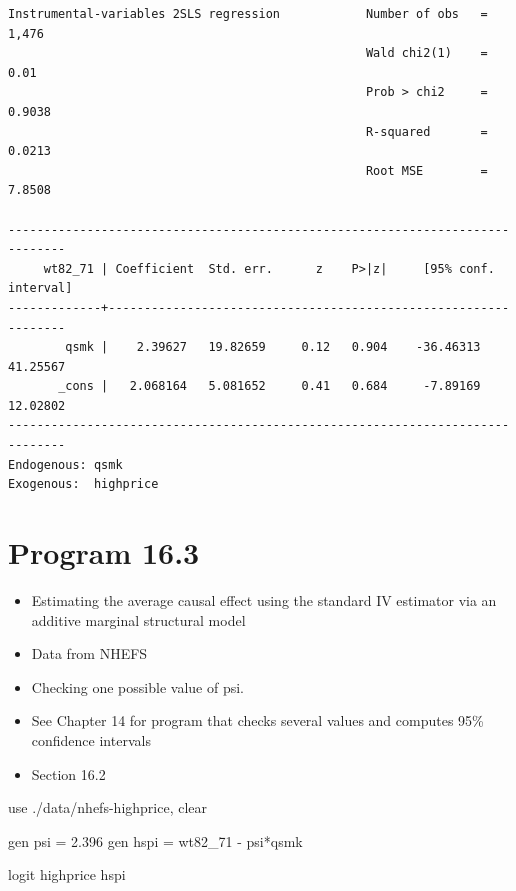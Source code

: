 \documentclass[
  10pt,
  a4paper,
]{book}
\newenvironment{Shaded}{\begin{snugshade}}{\end{snugshade}}
\newcommand{\KeywordTok}[1]{\textcolor[rgb]{0.00,0.46,0.62}{#1}}
\newcommand{\NormalTok}[1]{\textcolor[rgb]{0.00,0.46,0.62}{#1}}
\providecommand{\tightlist}{%
  \setlength{\itemsep}{0pt}\setlength{\parskip}{0pt}}
\begin{document}
\begin{verbatim}
Instrumental-variables 2SLS regression            Number of obs   =      1,476
                                                  Wald chi2(1)    =       0.01
                                                  Prob > chi2     =     0.9038
                                                  R-squared       =     0.0213
                                                  Root MSE        =     7.8508

------------------------------------------------------------------------------
     wt82_71 | Coefficient  Std. err.      z    P>|z|     [95% conf. interval]
-------------+----------------------------------------------------------------
        qsmk |    2.39627   19.82659     0.12   0.904    -36.46313    41.25567
       _cons |   2.068164   5.081652     0.41   0.684     -7.89169    12.02802
------------------------------------------------------------------------------
Endogenous: qsmk
Exogenous:  highprice
\end{verbatim}

\section{Program 16.3}\label{program-16.3-1}

\begin{itemize}
\tightlist
\item
  Estimating the average causal effect using the standard IV estimator via an additive marginal structural model
\item
  Data from NHEFS
\item
  Checking one possible value of psi.
\item
  See Chapter 14 for program that checks several values and computes 95\% confidence intervals\\
\item
  Section 16.2
\end{itemize}

\begin{Shaded}
\begin{Highlighting}[]
\KeywordTok{use}\NormalTok{ ./}\KeywordTok{data}\NormalTok{/nhefs{-}highprice, }\KeywordTok{clear}

\KeywordTok{gen}\NormalTok{ psi = 2.396}
\KeywordTok{gen}\NormalTok{ hspi = wt82\_71 {-} psi*qsmk}

\KeywordTok{logit}\NormalTok{ highprice hspi}
\end{Highlighting}
\end{Shaded}
\end{document}
